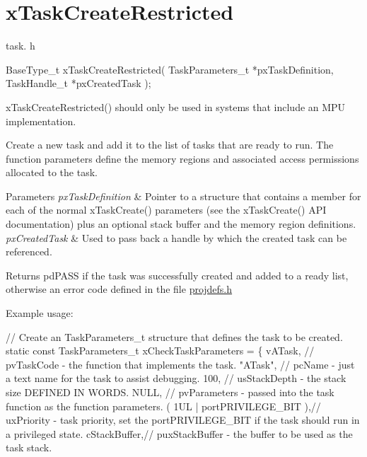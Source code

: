 \hypertarget{group__x_task_create_restricted}{}\section{x\+Task\+Create\+Restricted}
\label{group__x_task_create_restricted}
task. h 
\begin{DoxyPre}
 BaseType\_t xTaskCreateRestricted( TaskParameters\_t *pxTaskDefinition, TaskHandle\_t *pxCreatedTask );\end{DoxyPre}


x\+Task\+Create\+Restricted() should only be used in systems that include an M\+PU implementation.

Create a new task and add it to the list of tasks that are ready to run. The function parameters define the memory regions and associated access permissions allocated to the task.


\begin{DoxyParams}{Parameters}
{\em px\+Task\+Definition} & Pointer to a structure that contains a member for each of the normal x\+Task\+Create() parameters (see the x\+Task\+Create() A\+PI documentation) plus an optional stack buffer and the memory region definitions.\\
\hline
{\em px\+Created\+Task} & Used to pass back a handle by which the created task can be referenced.\\
\hline
\end{DoxyParams}
\begin{DoxyReturn}{Returns}
pd\+P\+A\+SS if the task was successfully created and added to a ready list, otherwise an error code defined in the file \hyperlink{projdefs_8h}{projdefs.\+h}
\end{DoxyReturn}
Example usage\+: 
\begin{DoxyPre}
// Create an TaskParameters\_t structure that defines the task to be created.
static const TaskParameters\_t xCheckTaskParameters =
\{
    vATask,     // pvTaskCode - the function that implements the task.
    "ATask",    // pcName - just a text name for the task to assist debugging.
    100,        // usStackDepth - the stack size DEFINED IN WORDS.
    NULL,       // pvParameters - passed into the task function as the function parameters.
    ( 1UL | portPRIVILEGE\_BIT ),// uxPriority - task priority, set the portPRIVILEGE\_BIT if the task should run in a privileged state.
    cStackBuffer,// puxStackBuffer - the buffer to be used as the task stack.\end{DoxyPre}



